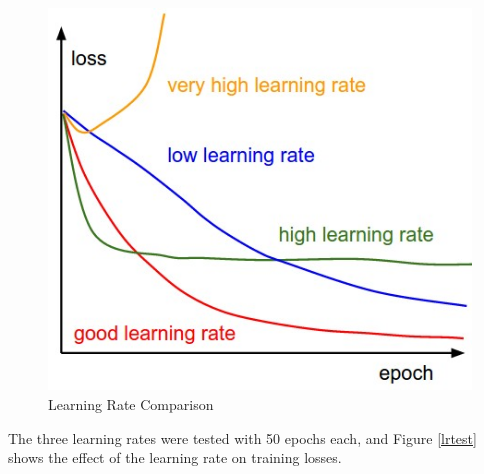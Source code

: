 \begin{figure}[h]
    \centering
    \includegraphics[width = .8\textwidth]{Images/learning rate.jpeg}
    \caption{Learning Rate Comparison \cite{cs231n}}
    \label{lrcomp}
\end{figure}

\newpage
The three learning rates were tested with 50 epochs each, and Figure \ref{lrtest} shows the effect of the learning rate on training losses. 

